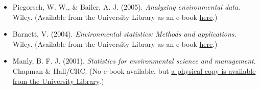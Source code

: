 \documentclass[
  letterpaper,
  DIV=11,
  numbers=noendperiod]{scrartcl}
\providecommand{\tightlist}{%
  \setlength{\itemsep}{0pt}\setlength{\parskip}{0pt}}\usepackage{longtable,booktabs,array}
\begin{document}
\begin{itemize}
\tightlist
\item
  Piegorsch, W. W., \& Bailer, A. J. (2005). \emph{Analyzing
  environmental data}. Wiley. (Available from the University Library as
  an e-book \href{https://go.exlibris.link/6wbh6zq0}{here}.)
\item
  Barnett, V. (2004). \emph{Environmental statistics: Methods and
  applications}. Wiley. (Available from the University Library as an
  e-book \href{https://go.exlibris.link/TbMBCTkV}{here}.)
\item
  Manly, B. F. J. (2001). \emph{Statistics for environmental science and
  management}. Chapman \& Hall/CRC. (No e-book available, but
  \href{https://go.exlibris.link/Jcyj94mj}{a physical copy is available
  from the University Library}.)
\end{itemize}
\end{document}
